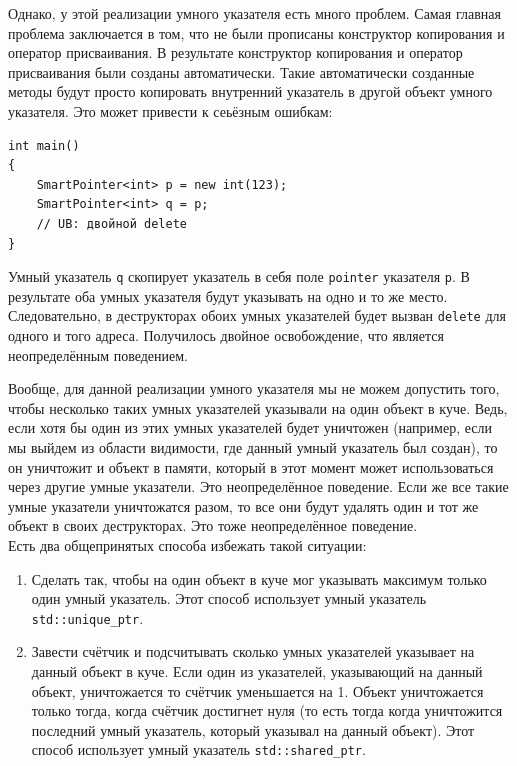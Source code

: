 \documentclass{article}
\begin{document}
Однако, у этой реализации умного указателя есть много проблем. Самая главная проблема заключается в том, что не были прописаны конструктор копирования и оператор присваивания. В результате конструктор копирования и оператор присваивания были созданы автоматически. Такие автоматически созданные методы будут просто копировать внутренний указатель в другой объект умного указателя. Это может привести к сеьёзным ошибкам:
\begin{lstlisting}
int main()
{
	SmartPointer<int> p = new int(123);
	SmartPointer<int> q = p;
	// UB: двойной delete
}
\end{lstlisting}
Умный указатель \texttt{q} скопирует указатель в себя поле \texttt{pointer} указателя \texttt{p}. В результате оба умных указателя будут указывать на одно и то же место. Следовательно, в деструкторах  обоих умных указателей будет вызван \texttt{delete} для одного и того адреса. Получилось двойное освобождение, что является неопределённым поведением.

Вообще, для данной реализации умного указателя мы не можем допустить того, чтобы несколько таких умных указателей указывали на один объект в куче. Ведь, если хотя бы один из этих умных указателей будет уничтожен (например, если мы выйдем из области видимости, где данный умный указатель был создан), то он уничтожит и объект в памяти, который в этот момент может использоваться через другие умные указатели. Это неопределённое поведение. Если же все такие умные указатели уничтожатся разом, то все они будут удалять один и тот же объект в своих деструкторах. Это тоже неопределённое поведение.\\


\newpage
Есть два общепринятых способа избежать такой ситуации:
\begin{enumerate}
\item Сделать так, чтобы на один объект в куче мог указывать максимум только один умный указатель. Этот способ использует умный указатель \texttt{std::unique\_ptr}.
\item Завести счётчик и подсчитывать сколько умных указателей указывает на данный объект в куче. Если один из указателей, указывающий на данный объект, уничтожается то счётчик уменьшается на 1. Объект уничтожается только тогда, когда счётчик достигнет нуля (то есть тогда когда уничтожится последний умный указатель, который указывал на данный объект). Этот способ использует умный указатель \texttt{std::shared\_ptr}.
\end{enumerate}
\end{document}
